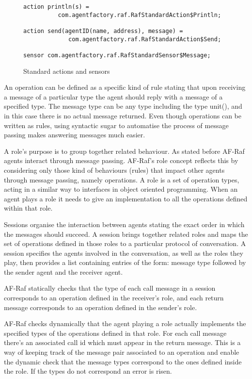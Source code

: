 \documentclass[a4paper,12pt,oneside,fleqn]{book} %
\begin{document}
\begin{figure}\footnotesize %
\begin{verbatim}
action println(s) =
          com.agentfactory.raf.RafStandardAction$Println;

action send(agentID(name, address), message) =
             com.agentfactory.raf.RafStandardAction$Send;

sensor com.agentfactory.raf.RafStandardSensor$Message;
\end{verbatim}
\caption{Standard actions and sensors}
\label{fig:actions-sensors}
\end{figure} %


An operation can be defined as a specific kind of rule stating that upon
receiving a message of a particular type the agent should reply with a
message of a specified type. The message type can be any type including the
type unit(), and in this case there is no actual message returned. Even
though operations can be written as rules, using syntactic sugar to
automatise the process of message passing makes answering messages much
easier.

A role's purpose is to group together related behaviour. As stated before
AF-Raf agents interact through message passing. AF-Raf's role concept
reflects this by considering only those kind of behaviours (rules) that
impact other agents through message passing, namely operations. A role is a
set of operation types, acting in a similar way to interfaces in object
oriented programming. When an agent plays a role it needs to give an
implementation to all the operations defined within that role.

Sessions organise the interaction between agents stating the exact order in
which the messages should succeed. A session brings together related roles
and maps the set of operations defined in those roles to a particular
protocol of conversation. A session specifies the agents involved in the
conversation, as well as the roles they play, then provides a list
containing entries of the form: message type followed by the sender agent
and the receiver agent.

AF-Raf statically checks that the type of each call message in a session
corresponds to an operation defined in the receiver's role, and each return
message corresponds to an operation defined in the sender's role.

AF-Raf checks dynamically that the agent playing a role actually implements
the specified types of the operations defined in that role.  For each call
message there's an associated call id which must appear in the return
message. This is a way of keeping track of the message pair associated to
an operation and enable the dynamic check that the message types correspond
to the ones defined inside the role. If the types do not correspond an
error is risen.
\end{document}
